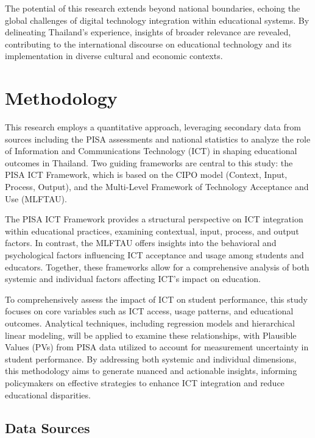 \documentclass[
]{article}
\begin{document}
The potential of this research extends beyond national boundaries,
echoing the global challenges of digital technology integration within
educational systems. By delineating Thailand's experience, insights of
broader relevance are revealed, contributing to the international
discourse on educational technology and its implementation in diverse
cultural and economic contexts.

\hypertarget{methodology}{%
\section{Methodology}\label{methodology}}

This research employs a quantitative approach, leveraging secondary data
from sources including the PISA assessments and national statistics to
analyze the role of Information and Communications Technology (ICT) in
shaping educational outcomes in Thailand. Two guiding frameworks are
central to this study: the PISA ICT Framework, which is based on the
CIPO model (Context, Input, Process, Output), and the Multi-Level
Framework of Technology Acceptance and Use (MLFTAU).

The PISA ICT Framework provides a structural perspective on ICT
integration within educational practices, examining contextual, input,
process, and output factors. In contrast, the MLFTAU offers insights
into the behavioral and psychological factors influencing ICT acceptance
and usage among students and educators. Together, these frameworks allow
for a comprehensive analysis of both systemic and individual factors
affecting ICT's impact on education.

To comprehensively assess the impact of ICT on student performance, this
study focuses on core variables such as ICT access, usage patterns, and
educational outcomes. Analytical techniques, including regression models
and hierarchical linear modeling, will be applied to examine these
relationships, with Plausible Values (PVs) from PISA data utilized to
account for measurement uncertainty in student performance. By
addressing both systemic and individual dimensions, this methodology
aims to generate nuanced and actionable insights, informing policymakers
on effective strategies to enhance ICT integration and reduce
educational disparities.

\hypertarget{data-sources}{%
\subsection{Data Sources}\label{data-sources}}
\end{document}
